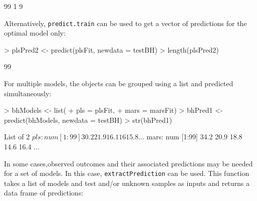 \documentclass[12pt]{article}
\begin{document}
\begin{small}
\begin{Schunk}
\begin{Soutput}
[1] 99  1  9
\end{Soutput}
\end{Schunk}
\end{small}
Alternatively, \texttt{predict.train} can be used to get a vector of predictions for the optimal model only:
\begin{small}
\begin{Schunk}
\begin{Sinput}
> plsPred2 <- predict(plsFit, newdata = testBH)
> length(plsPred2)
\end{Sinput}
\begin{Soutput}
[1] 99
\end{Soutput}
\end{Schunk}
\end{small}
For multiple models, the objects can be grouped using a list and predicted simultaneously:
\begin{small}
\begin{Schunk}
\begin{Sinput}
> bhModels <- list(
+                  pls = plsFit,
+                  mars = marsFit)
> bhPred1 <- predict(bhModels, newdata = testBH)
> str(bhPred1)
\end{Sinput}
\begin{Soutput}
List of 2
 $ pls : num [1:99] 30.2 21.9 16.1 16 15.8 ...
 $ mars: num [1:99] 34.2 20.9 18.8 14.6 16.4 ...
\end{Soutput}
\end{Schunk}
\end{small}
In some cases,observed outcomes and their associated predictions may be needed for a set of models. In this case, \texttt{extractPrediction} can be used. This function takes a list of models and test and/or unknown samples as inputs and returns a data frame of predictions:
\end{document}
